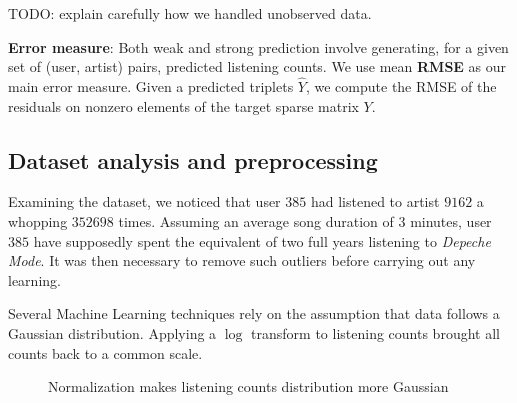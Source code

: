 \documentclass{article}
\begin{document}
  TODO: explain carefully how we handled unobserved data.

  \textbf{Error measure}: Both weak and strong prediction involve generating, for a given set of (user, artist) pairs, predicted listening counts. We use mean \textbf{RMSE} as our main error measure. Given a predicted triplets $\hat{Y}$, we compute the RMSE of the residuals on nonzero elements of the target sparse matrix $Y$.\\

  \subsection{Dataset analysis and preprocessing}
  Examining the dataset, we noticed that user $385$ had listened to artist $9162$ a whopping $352698$ times. Assuming an average song duration of $3$ minutes, user $385$ have supposedly spent the equivalent of two full years listening to \textit{Depeche Mode}. It was then necessary to remove such outliers before carrying out any learning.

  Several Machine Learning techniques rely on the assumption that data follows a Gaussian distribution. Applying a $\log$ transform to listening counts brought all counts back to a common scale.

  \begin{figure}[ht]
    \center
    \caption{Normalization makes listening counts distribution more Gaussian}
    \label{fig:recommendation-normalization}
  \end{figure}
\end{document}
